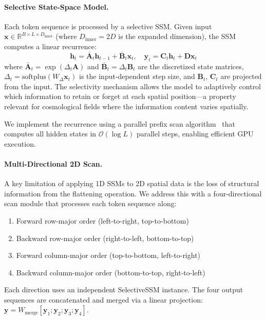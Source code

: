 \documentclass[twocolumn,showpacs,preprintnumbers,amsmath,amssymb,aps,prd]{revtex4-2}
\begin{document}
\paragraph{Selective State-Space Model.}
Each token sequence is processed by a selective SSM. Given input
$\mathbf{x} \in \mathbb{R}^{B \times L \times D_{\text{inner}}}$ (where
$D_{\text{inner}} = 2D$ is the expanded dimension), the SSM computes a linear recurrence:
%
\begin{equation}
    \mathbf{h}_t = \bar{\mathbf{A}}_t \mathbf{h}_{t-1} + \bar{\mathbf{B}}_t \mathbf{x}_t,
    \quad
    \mathbf{y}_t = \mathbf{C}_t \mathbf{h}_t + \mathbf{D} \mathbf{x}_t
    \label{eq:ssm}
\end{equation}
%
where $\bar{\mathbf{A}}_t = \exp(\Delta_t \mathbf{A})$ and
$\bar{\mathbf{B}}_t = \Delta_t \mathbf{B}_t$ are the discretized state matrices,
$\Delta_t = \text{softplus}(W_\Delta \mathbf{x}_t)$ is the input-dependent step size,
and $\mathbf{B}_t$, $\mathbf{C}_t$ are projected from the input. The selectivity
mechanism allows the model to adaptively control which information to retain or forget at
each spatial position---a property relevant for cosmological fields where the information
content varies spatially.

We implement the recurrence using a parallel prefix scan
algorithm~\cite{blelloch1990prefix} that computes all hidden states in
$\mathcal{O}(\log L)$ parallel steps, enabling efficient GPU execution.

\paragraph{Multi-Directional 2D Scan.}
A key limitation of applying 1D SSMs to 2D spatial data is the loss of structural
information from the flattening operation. We address this with a four-directional scan
module that processes each token sequence along:
%
\begin{enumerate}
    \item Forward row-major order (left-to-right, top-to-bottom)
    \item Backward row-major order (right-to-left, bottom-to-top)
    \item Forward column-major order (top-to-bottom, left-to-right)
    \item Backward column-major order (bottom-to-top, right-to-left)
\end{enumerate}
%
Each direction uses an independent SelectiveSSM instance. The four output sequences are
concatenated and merged via a linear projection:
$\mathbf{y} = W_{\text{merge}} [\mathbf{y}_1; \mathbf{y}_2; \mathbf{y}_3; \mathbf{y}_4]$.
\end{document}
